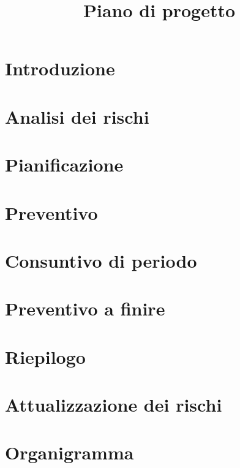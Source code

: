 \documentclass{article}
\title{Piano di progetto}
\begin{document}


\section{Introduzione}%
\label{sec:introduzione}

\newpage
\section{Analisi dei rischi}%
\label{sec:analisi_dei_rischi}

\newpage
\section{Pianificazione}%
\label{sec:pianificazione}

\newpage
\section{Preventivo}%
\label{sec:preventivo}

\newpage
\section{Consuntivo di periodo}%
\label{sec:consuntivo_di_periodo}

\section{Preventivo a finire}%
\label{sec:preventivo_a_finire}

\section{Riepilogo}%
\label{sec:riepilogo}

\newpage
\appendix
\section{Attualizzazione dei rischi}%
\label{sec:attualizzazione_dei_rischi}

\newpage
\section{Organigramma}%
\label{sec:organigramma}

\end{document}
